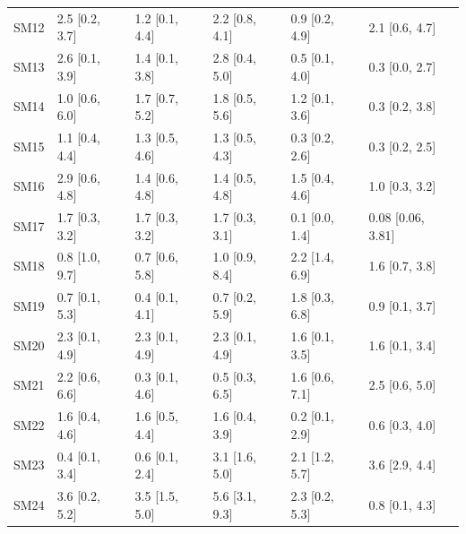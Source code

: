 \documentclass[9pt,lineno,final]{elife}
\begin{document}
\begin{table}[H]
\begin{tabular}{llllll}
SM12     &   2.5 [0.2, 3.7] &     1.2 [0.1, 4.4] &     2.2 [0.8, 4.1] &  0.9 [0.2, 4.9] &     2.1 [0.6, 4.7] \\
SM13     &   2.6 [0.1, 3.9] &     1.4 [0.1, 3.8] &     2.8 [0.4, 5.0] &  0.5 [0.1, 4.0] &     0.3 [0.0, 2.7] \\
SM14     &   1.0 [0.6, 6.0] &     1.7 [0.7, 5.2] &     1.8 [0.5, 5.6] &  1.2 [0.1, 3.6] &     0.3 [0.2, 3.8] \\
SM15     &   1.1 [0.4, 4.4] &     1.3 [0.5, 4.6] &     1.3 [0.5, 4.3] &  0.3 [0.2, 2.6] &     0.3 [0.2, 2.5] \\
SM16     &   2.9 [0.6, 4.8] &     1.4 [0.6, 4.8] &     1.4 [0.5, 4.8] &  1.5 [0.4, 4.6] &     1.0 [0.3, 3.2] \\
SM17     &   1.7 [0.3, 3.2] &     1.7 [0.3, 3.2] &     1.7 [0.3, 3.1] &  0.1 [0.0, 1.4] &  0.08 [0.06, 3.81] \\
SM18     &   0.8 [1.0, 9.7] &     0.7 [0.6, 5.8] &     1.0 [0.9, 8.4] &  2.2 [1.4, 6.9] &     1.6 [0.7, 3.8] \\
SM19     &   0.7 [0.1, 5.3] &     0.4 [0.1, 4.1] &     0.7 [0.2, 5.9] &  1.8 [0.3, 6.8] &     0.9 [0.1, 3.7] \\
SM20     &   2.3 [0.1, 4.9] &     2.3 [0.1, 4.9] &     2.3 [0.1, 4.9] &  1.6 [0.1, 3.5] &     1.6 [0.1, 3.4] \\
SM21     &   2.2 [0.6, 6.6] &     0.3 [0.1, 4.6] &     0.5 [0.3, 6.5] &  1.6 [0.6, 7.1] &     2.5 [0.6, 5.0] \\
SM22     &   1.6 [0.4, 4.6] &     1.6 [0.5, 4.4] &     1.6 [0.4, 3.9] &  0.2 [0.1, 2.9] &     0.6 [0.3, 4.0] \\
SM23     &   0.4 [0.1, 3.4] &     0.6 [0.1, 2.4] &     3.1 [1.6, 5.0] &  2.1 [1.2, 5.7] &     3.6 [2.9, 4.4] \\
SM24     &   3.6 [0.2, 5.2] &     3.5 [1.5, 5.0] &     5.6 [3.1, 9.3] &  2.3 [0.2, 5.3] &     0.8 [0.1, 4.3] \\
\bottomrule
\end{tabular}
 
\end{table}
\end{document}
